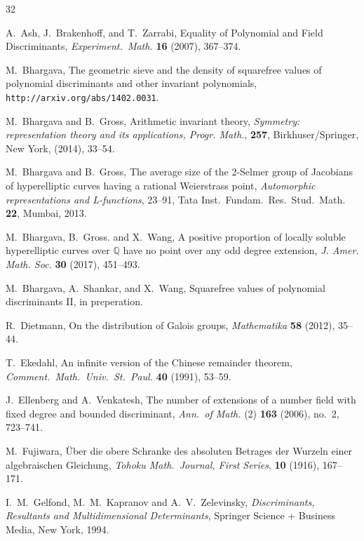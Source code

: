 \documentclass[11pt]{article}
\def\Q{{\mathbb Q}}
\def\Q{{\mathbb Q}}
\begin{document}
\begin{thebibliography}{32}

A.\ Ash, J.\ Brakenhoff, and T.\ Zarrabi, Equality of Polynomial and Field Discriminants,
{\it Experiment.\ Math.} {\bf 16} (2007), 367--374.


 M.\ Bhargava, The geometric sieve and the density
  of squarefree values of polynomial discriminants and other invariant
  polynomials, {\tt http://arxiv.org/abs/1402.0031}.

 M.\ Bhargava and B.\ Gross, Arithmetic invariant theory,
  {\it Symmetry: representation theory and its applications,
    Progr. Math.}, {\bf 257}, Birkhuser/Springer, New York, (2014), 33--54.

 M.\ Bhargava and B.\ Gross, The average size of the
  2-Selmer group of Jacobians of hyperelliptic curves having a
  rational Weierstrass point, {\it Automorphic representations and
    L-functions}, 23--91, Tata Inst.\ Fundam.\ Res.\ Stud.\ Math.\,
  \textbf{22}, Mumbai, 2013.


M.\ Bhargava, B.\ Gross. and X.\ Wang, A positive proportion of
locally soluble hyperelliptic curves over $\Q$ have no point over
any odd degree extension, {\it J. Amer. Math. Soc.} {\bf 30} (2017),
451--493.


 M.\ Bhargava, A.\ Shankar, and X.\ Wang, Squarefree
  values of polynomial discriminants II, in preperation.


 R.\ Dietmann, On the distribution of Galois groups,
  {\it Mathematika} {\bf 58} (2012), 35--44.

T.\ Ekedahl, An infinite version of the Chinese remainder theorem,
{\it Comment.\ Math.\ Univ.\ St.\ Paul.} {\bf 40} (1991), 53--59.

 J.\ Ellenberg and A.\ Venkatesh, The number of extensions
  of a number field with fixed degree and bounded discriminant, {\it
    Ann.\ of Math.} (2) {\bf 163} (2006), no.\ 2, 723--741.


 M.\ Fujiwara, {\"U}ber die obere Schranke des
  absoluten Betrages der Wurzeln einer algebraischen Gleichung, {\it
    Tohoku Math.\ Journal, First Series}, {\bf 10} (1916), 167--171.

 I.\ M.\ Gelfond, M.\ M.\ Kapranov and
  A.\ V.\ Zelevinsky, {\it Discriminants, Resultants and
    Multidimensional Determinants}, Springer Science + Business Media,
  New York, 1994.


\end{thebibliography}
\end{document}
